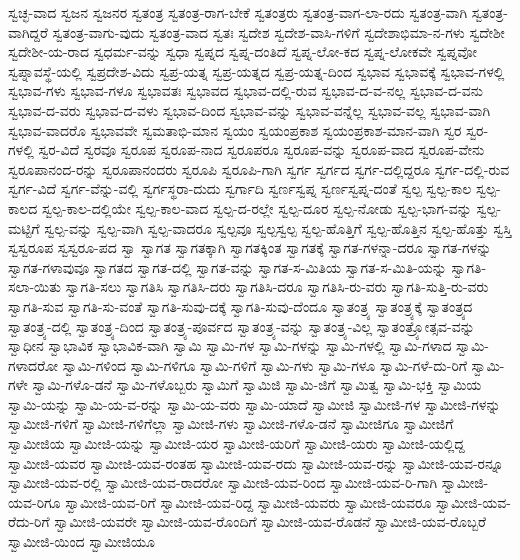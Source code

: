 {ಸ್ವಚ್ಛ-ವಾದ
ಸ್ವಜನ
ಸ್ವಜನರ
ಸ್ವತಂತ್ರ
ಸ್ವತಂತ್ರ-ರಾಗ-ಬೇಕೆ
ಸ್ವತಂತ್ರರು
ಸ್ವತಂತ್ರ-ವಾಗ-ಲಾ-ರದು
ಸ್ವತಂತ್ರ-ವಾಗಿ
ಸ್ವತಂತ್ರ-ವಾಗಿದ್ದರೆ
ಸ್ವತಂತ್ರ-ವಾಗು-ವುದು
ಸ್ವತಂತ್ರ-ವಾದ
ಸ್ವತಃ
ಸ್ವದೇಶ
ಸ್ವದೇಶ-ವಾಸಿ-ಗಳಿಗೆ
ಸ್ವದೇಶಾಭಿಮಾ-ನ-ಗಳು
ಸ್ವದೇಶೀ
ಸ್ವದೇಶೀ-ಯ-ರಾದ
ಸ್ವಧರ್ಮ-ವನ್ನು
ಸ್ವಧಾ
ಸ್ವಪ್ನದ
ಸ್ವಪ್ನ-ದಂತಿದೆ
ಸ್ವಪ್ನ-ಲೋ-ಕದ
ಸ್ವಪ್ನ-ಲೋಕವೇ
ಸ್ವಪ್ನವೋ
ಸ್ವಪ್ನಾವಸ್ಥೆ-ಯಲ್ಲಿ
ಸ್ವಪ್ರದೇಶ-ವಿದು
ಸ್ವಪ್ರ-ಯತ್ನ
ಸ್ವಪ್ರ-ಯತ್ನದ
ಸ್ವಪ್ರ-ಯತ್ನ-ದಿಂದ
ಸ್ವಭಾವ
ಸ್ವಭಾವಕ್ಕೆ
ಸ್ವಭಾವ-ಗಳಲ್ಲಿ
ಸ್ವಭಾವ-ಗಳು
ಸ್ವಭಾವ-ಗಳೂ
ಸ್ವಭಾವತಃ
ಸ್ವಭಾವದ
ಸ್ವಭಾವ-ದಲ್ಲಿ-ರುವ
ಸ್ವಭಾವ-ದ-ವ-ನಲ್ಲ
ಸ್ವಭಾವ-ದ-ವನು
ಸ್ವಭಾವ-ದ-ವರು
ಸ್ವಭಾವ-ದ-ವಳು
ಸ್ವಭಾವ-ದಿಂದ
ಸ್ವಭಾವ-ವನ್ನು
ಸ್ವಭಾವ-ವನ್ನೆಲ್ಲ
ಸ್ವಭಾವ-ವಲ್ಲ
ಸ್ವಭಾವ-ವಾಗಿ
ಸ್ವಭಾವ-ವಾದರೊ
ಸ್ವಭಾವವೇ
ಸ್ವಮತಾಭಿ-ಮಾನ
ಸ್ವಯಂ
ಸ್ವಯಂಪ್ರಕಾಶ
ಸ್ವಯಂಪ್ರಕಾಶ-ಮಾನ-ವಾಗಿ
ಸ್ವರ
ಸ್ವರ-ಗಳಲ್ಲಿ
ಸ್ವರ-ವಿದೆ
ಸ್ವರವೂ
ಸ್ವರೂಪ
ಸ್ವರೂಪ-ನಾದ
ಸ್ವರೂಪರೂ
ಸ್ವರೂಪ-ವನ್ನು
ಸ್ವರೂಪ-ವಾದ
ಸ್ವರೂಪ-ವೇನು
ಸ್ವರೂಪಾನಂದ-ರನ್ನು
ಸ್ವರೂಪಾನಂದರು
ಸ್ವರೂಪಿ
ಸ್ವರೂಪಿ-ಗಾಗಿ
ಸ್ವರ್ಗ
ಸ್ವರ್ಗದ
ಸ್ವರ್ಗ-ದಲ್ಲಿದ್ದರೂ
ಸ್ವರ್ಗ-ದಲ್ಲಿ-ರುವ
ಸ್ವರ್ಗ-ವಿದೆ
ಸ್ವರ್ಗ-ವೆನ್ನು-ವಲ್ಲಿ
ಸ್ವರ್ಗಸ್ಥರಾ-ದುದು
ಸ್ವರ್ಗಾದಿ
ಸ್ವರ್ಣಸ್ವಪ್ನ
ಸ್ವರ್ಣಸ್ವಪ್ನ-ದಂತೆ
ಸ್ವಲ್ಪ
ಸ್ವಲ್ಪ-ಕಾಲ
ಸ್ವಲ್ಪ-ಕಾಲದ
ಸ್ವಲ್ಪ-ಕಾಲ-ದಲ್ಲಿಯೇ
ಸ್ವಲ್ಪ-ಕಾಲ-ವಾದ
ಸ್ವಲ್ಪ-ದ-ರಲ್ಲೇ
ಸ್ವಲ್ಪ-ದೂರ
ಸ್ವಲ್ಪ-ನೋಡು
ಸ್ವಲ್ಪ-ಭಾಗ-ವನ್ನು
ಸ್ವಲ್ಪ-ಮಟ್ಟಿಗೆ
ಸ್ವಲ್ಪ-ವನ್ನು
ಸ್ವಲ್ಪ-ವಾಗಿ
ಸ್ವಲ್ಪ-ವಾದರೂ
ಸ್ವಲ್ಪವೂ
ಸ್ವಲ್ಪಸ್ವಲ್ಪ
ಸ್ವಲ್ಪ-ಹೊತ್ತಿಗೆ
ಸ್ವಲ್ಪ-ಹೊತ್ತಿನ
ಸ್ವಲ್ಪ-ಹೊತ್ತು
ಸ್ವಸ್ತಿ
ಸ್ವಸ್ವರೂಪ
ಸ್ವಸ್ವರೂ-ಪದ
ಸ್ವಾ
ಸ್ವಾಗತ
ಸ್ವಾಗತಕ್ಕಾಗಿ
ಸ್ವಾಗತಕ್ಕಿಂತ
ಸ್ವಾಗತಕ್ಕೆ
ಸ್ವಾಗತ-ಗಳನ್ನಾ-ದರೂ
ಸ್ವಾಗತ-ಗಳನ್ನು
ಸ್ವಾಗತ-ಗಳಾವುವೂ
ಸ್ವಾಗತದ
ಸ್ವಾಗತ-ದಲ್ಲಿ
ಸ್ವಾಗತ-ವನ್ನು
ಸ್ವಾಗತ-ಸ-ಮಿತಿಯ
ಸ್ವಾಗತ-ಸ-ಮಿತಿ-ಯನ್ನು
ಸ್ವಾಗತಿ-ಸಲಾ-ಯಿತು
ಸ್ವಾಗತಿ-ಸಲು
ಸ್ವಾಗತಿಸಿ
ಸ್ವಾಗತಿಸಿ-ದರು
ಸ್ವಾಗತಿಸಿ-ದರೂ
ಸ್ವಾಗತಿಸಿ-ರು-ವರು
ಸ್ವಾಗತಿ-ಸುತ್ತಿ-ರು-ವರು
ಸ್ವಾಗತಿ-ಸುವ
ಸ್ವಾಗತಿ-ಸು-ವಂತೆ
ಸ್ವಾಗತಿ-ಸುವು-ದಕ್ಕೆ
ಸ್ವಾಗತಿ-ಸುವು-ದೆಂದೂ
ಸ್ವಾತಂತ್ರ್ಯ
ಸ್ವಾತಂತ್ರ್ಯಕ್ಕೆ
ಸ್ವಾತಂತ್ರ್ಯದ
ಸ್ವಾತಂತ್ರ್ಯ-ದಲ್ಲಿ
ಸ್ವಾತಂತ್ರ್ಯ-ದಿಂದ
ಸ್ವಾತಂತ್ರ್ಯ-ಪೂರ್ವದ
ಸ್ವಾತಂತ್ರ್ಯ-ವನ್ನು
ಸ್ವಾತಂತ್ರ್ಯ-ವಿಲ್ಲ
ಸ್ವಾತಂತ್ರ್ಯೋತ್ಸವ-ವನ್ನು
ಸ್ವಾಧೀನ
ಸ್ವಾಭಾವಿಕ
ಸ್ವಾಭಾವಿಕ-ವಾಗಿ
ಸ್ವಾಮಿ
ಸ್ವಾಮಿ-ಗಳ
ಸ್ವಾಮಿ-ಗಳನ್ನು
ಸ್ವಾಮಿ-ಗಳಲ್ಲಿ
ಸ್ವಾಮಿ-ಗಳಾದ
ಸ್ವಾಮಿ-ಗಳಾದರೋ
ಸ್ವಾಮಿ-ಗಳಿಂದ
ಸ್ವಾಮಿ-ಗಳಿಗೂ
ಸ್ವಾಮಿ-ಗಳಿಗೆ
ಸ್ವಾಮಿ-ಗಳು
ಸ್ವಾಮಿ-ಗಳೂ
ಸ್ವಾಮಿ-ಗಳೆ-ದು-ರಿಗೆ
ಸ್ವಾಮಿ-ಗಳೇ
ಸ್ವಾಮಿ-ಗಳೊ-ಡನೆ
ಸ್ವಾಮಿ-ಗಳೊಬ್ಬರು
ಸ್ವಾಮಿಗೆ
ಸ್ವಾಮಿಜಿ
ಸ್ವಾಮಿ-ಜಿಗೆ
ಸ್ವಾಮಿತ್ವ
ಸ್ವಾಮಿ-ಭಕ್ತಿ
ಸ್ವಾಮಿಯ
ಸ್ವಾಮಿ-ಯನ್ನು
ಸ್ವಾಮಿ-ಯ-ವ-ರನ್ನು
ಸ್ವಾಮಿ-ಯ-ವರು
ಸ್ವಾಮಿ-ಯಾದೆ
ಸ್ವಾಮೀಜಿ
ಸ್ವಾಮೀಜಿ-ಗಳ
ಸ್ವಾಮೀಜಿ-ಗಳನ್ನು
ಸ್ವಾಮೀಜಿ-ಗಳಿಗೆ
ಸ್ವಾಮೀಜಿ-ಗಳಿಗೆಲ್ಲಾ
ಸ್ವಾಮೀಜಿ-ಗಳು
ಸ್ವಾಮೀಜಿ-ಗಳೊ-ಡನೆ
ಸ್ವಾಮೀಜಿಗೂ
ಸ್ವಾಮೀಜಿಗೆ
ಸ್ವಾಮೀಜಿಯ
ಸ್ವಾಮೀಜಿ-ಯನ್ನು
ಸ್ವಾಮೀಜಿ-ಯರ
ಸ್ವಾಮೀಜಿ-ಯರಿಗೆ
ಸ್ವಾಮೀಜಿ-ಯರು
ಸ್ವಾಮೀಜಿ-ಯಲ್ಲಿದ್ದ
ಸ್ವಾಮೀಜಿ-ಯವರ
ಸ್ವಾಮೀಜಿ-ಯವ-ರಂತಹ
ಸ್ವಾಮೀಜಿ-ಯವ-ರದು
ಸ್ವಾಮೀಜಿ-ಯವ-ರನ್ನು
ಸ್ವಾಮೀಜಿ-ಯವ-ರನ್ನೂ
ಸ್ವಾಮೀಜಿ-ಯವ-ರಲ್ಲಿ
ಸ್ವಾಮೀಜಿ-ಯವ-ರಾದರೋ
ಸ್ವಾಮೀಜಿ-ಯವ-ರಿಂದ
ಸ್ವಾಮೀಜಿ-ಯವ-ರಿ-ಗಾಗಿ
ಸ್ವಾಮೀಜಿ-ಯವ-ರಿಗೂ
ಸ್ವಾಮೀಜಿ-ಯವ-ರಿಗೆ
ಸ್ವಾಮೀಜಿ-ಯವ-ರಿದ್ದ
ಸ್ವಾಮೀಜಿ-ಯವರು
ಸ್ವಾಮೀಜಿ-ಯವರೂ
ಸ್ವಾಮೀಜಿ-ಯವ-ರೆದು-ರಿಗೆ
ಸ್ವಾಮೀಜಿ-ಯವರೇ
ಸ್ವಾಮೀಜಿ-ಯವ-ರೊಂದಿಗೆ
ಸ್ವಾಮೀಜಿ-ಯವ-ರೊಡನೆ
ಸ್ವಾಮೀಜಿ-ಯವ-ರೊಬ್ಬರೆ
ಸ್ವಾಮೀಜಿ-ಯಿಂದ
ಸ್ವಾಮೀಜಿಯೂ
}
